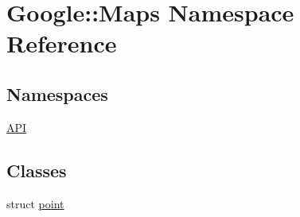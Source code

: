 \hypertarget{a00033}{}\section{Google\+:\+:Maps Namespace Reference}
\label{a00033}
\subsection*{Namespaces}
\begin{DoxyCompactItemize}
\item 
 \hyperlink{a00034}{A\+PI}
\end{DoxyCompactItemize}
\subsection*{Classes}
\begin{DoxyCompactItemize}
\item 
struct \hyperlink{a00052}{point}
\end{DoxyCompactItemize}
